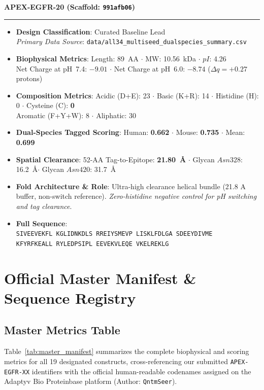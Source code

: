 \documentclass[11pt]{article}
\begin{document}
\noindent\textbf{\color{navyblue}\large APEX-EGFR-20  \quad (Scaffold: \texttt{991afb06})} \\
\vspace{-0.4em}
\rule{\textwidth}{0.6pt}
\vspace{-0.2em}
\begin{itemize}
  \setlength{\itemsep}{2pt}
  \setlength{\parskip}{0pt}
  \item \textbf{Design Classification}: Curated Baseline Lead \\
    \textit{Primary Data Source}: \texttt{\small data/all34\_multiseed\_dualspecies\_summary.csv}
  \item \textbf{Biophysical Metrics}: Length: 89~AA $\cdot$ MW: 10.56~kDa $\cdot$ $pI$: 4.26 \\
    Net Charge at pH~7.4: $-9.01$ $\cdot$ Net Charge at pH~6.0: $-8.74$ ($\Delta q = +0.27$ protons)
  \item \textbf{Composition Metrics}: Acidic (D+E): 23 $\cdot$ Basic (K+R): 14 $\cdot$ Histidine (H): 0 $\cdot$ Cysteine (C): \textbf{0} \\
    Aromatic (F+Y+W): 8 $\cdot$ Aliphatic: 30
  \item \textbf{Dual-Species Tagged Scoring}: Human: \textbf{0.662} $\cdot$ Mouse: \textbf{0.735} $\cdot$ Mean: \textbf{0.699}
  \item \textbf{Spatial Clearance}: 52-AA Tag-to-Epitope: \textbf{21.80~\AA} $\cdot$ Glycan $Asn328$: 16.2~\AA $\cdot$ Glycan $Asn420$: 31.7~\AA
  \item \textbf{Fold Architecture \& Role}: Ultra-high clearance helical bundle (21.8 A buffer, non-switch reference). \textit{Zero-histidine negative control for pH switching and tag clearance}.
  \item \textbf{Full Sequence}: \\
    \texttt{\small SIVEEVEKFL KGLIDNKDLS RREIYSMEVP LISKLFDLGA SDEEYDIVME \\
    KFYRFKEALL RYLEDPSIPL EEVEKVLEQE VKELREKLG}
\end{itemize}
\vspace{0.8em}


\section{Official Master Manifest \& Sequence Registry}

\subsection{Master Metrics Table}
Table~\ref{tab:master_manifest} summarizes the complete biophysical and scoring metrics for all 19 designated constructs, cross-referencing our submitted \texttt{APEX-EGFR-XX} identifiers with the official human-readable codenames assigned on the Adaptyv Bio Proteinbase platform (Author: \texttt{QntmSeer}).
\end{document}
